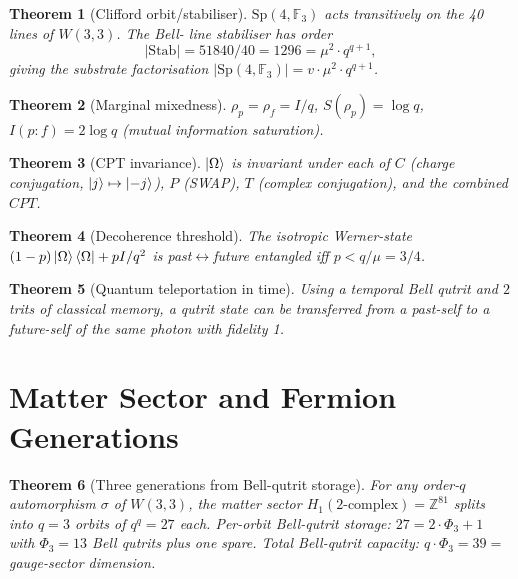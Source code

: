 \documentclass[11pt]{article}
\newtheorem{theorem}{Theorem}
\newcommand{\ZZ}{\mathbb{Z}}
\newcommand{\Sp}{\mathrm{Sp}}
\newcommand{\GF}[1]{\mathbb{F}_{#1}}
\begin{document}
\begin{theorem}[Clifford orbit/stabiliser]\label{thm:clifford}
$\Sp(4,\GF{3})$ acts transitively on the 40 lines of $W(3,3)$.  The Bell-
line stabiliser has order
\begin{equation}
  |\mathrm{Stab}| = 51840 / 40 = 1296 = \mu^2 \cdot q^{q+1},
\end{equation}
giving the substrate factorisation
$|\Sp(4,\GF{3})| = v\cdot\mu^2\cdot q^{q+1}$.
\end{theorem}

\begin{theorem}[Marginal mixedness]\label{thm:marginal}
$\rho_p = \rho_f = I/q$, $S(\rho_p) = \log q$, $I(p:f) = 2\log q$ (mutual
information saturation).
\end{theorem}

\begin{theorem}[CPT invariance]\label{thm:cpt}
$\ket{\Omega}$ is invariant under each of $C$ (charge conjugation,
$\ket{j}\mapsto\ket{-j}$), $P$ (SWAP), $T$ (complex conjugation), and
the combined $CPT$.
\end{theorem}

\begin{theorem}[Decoherence threshold]\label{thm:noise}
The isotropic Werner-state $(1-p)\ket{\Omega}\bra{\Omega} + p I/q^2$ is
past$\leftrightarrow$future entangled iff $p < q/\mu = 3/4$.
\end{theorem}

\begin{theorem}[Quantum teleportation in time]\label{thm:teleport}
Using a temporal Bell qutrit and $2$ trits of classical memory, a qutrit
state can be transferred from a past-self to a future-self of the same
photon with fidelity 1.
\end{theorem}

\section{Matter Sector and Fermion Generations}

\begin{theorem}[Three generations from Bell-qutrit storage]\label{thm:gens}
For any order-$q$ automorphism $\sigma$ of $W(3,3)$, the matter sector
$H_1(2\text{-complex}) = \ZZ^{81}$ splits into $q = 3$ orbits of
$q^q = 27$ each.  Per-orbit Bell-qutrit storage:
$27 = 2\cdot\Phi_3 + 1$ with $\Phi_3 = 13$ Bell qutrits plus one spare.
Total Bell-qutrit capacity: $q\cdot\Phi_3 = 39 = $ gauge-sector
dimension.
\end{theorem}
\end{document}
